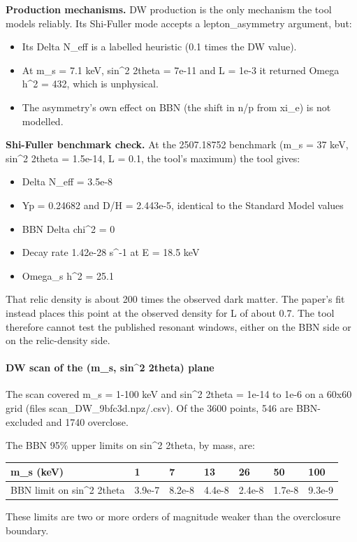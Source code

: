 \documentclass[11pt,a4paper]{article}
\begin{document}
\textbf{Production mechanisms.} DW production is the only mechanism the tool models reliably. Its Shi-Fuller mode accepts a lepton\_asymmetry argument, but:

\begin{itemize}
  \item Its Delta N\_eff is a labelled heuristic (0.1 times the DW value).
  \item At m\_s = 7.1 keV, sin\textasciicircum{}2 2theta = 7e-11 and L = 1e-3 it returned Omega h\textasciicircum{}2 = 432, which is unphysical.
  \item The asymmetry's own effect on BBN (the shift in n/p from xi\_e) is not modelled.
\end{itemize}
\textbf{Shi-Fuller benchmark check.} At the 2507.18752 benchmark (m\_s = 37 keV, sin\textasciicircum{}2 2theta = 1.5e-14, L = 0.1, the tool's maximum) the tool gives:

\begin{itemize}
  \item Delta N\_eff = 3.5e-8
  \item Yp = 0.24682 and D/H = 2.443e-5, identical to the Standard Model values
  \item BBN Delta chi\textasciicircum{}2 = 0
  \item Decay rate 1.42e-28 s\textasciicircum{}-1 at E = 18.5 keV
  \item Omega\_s h\textasciicircum{}2 = 25.1
\end{itemize}
That relic density is about 200 times the observed dark matter. The paper's fit instead places this point at the observed density for L of about 0.7. The tool therefore cannot test the published resonant windows, either on the BBN side or on the relic-density side.

\paragraph{DW scan of the (m\_s, sin\textasciicircum{}2 2theta) plane}
The scan covered m\_s = 1-100 keV and sin\textasciicircum{}2 2theta = 1e-14 to 1e-6 on a 60x60 grid (files scan\_DW\_9bfc3d.npz/.csv). Of the 3600 points, 546 are BBN-excluded and 1740 overclose.

The BBN 95\% upper limits on sin\textasciicircum{}2 2theta, by mass, are:

\begin{longtable}{@{}p{}p{}p{}p{}p{}p{}p{}@{}}
\toprule
\textbf{m\_s (keV)} & \textbf{1} & \textbf{7} & \textbf{13} & \textbf{26} & \textbf{50} & \textbf{100} \\ \midrule \endhead
BBN limit on sin\textasciicircum{}2 2theta & 3.9e-7 & 8.2e-8 & 4.4e-8 & 2.4e-8 & 1.7e-8 & 9.3e-9 \\
\bottomrule\end{longtable}
These limits are two or more orders of magnitude weaker than the overclosure boundary.
\end{document}
